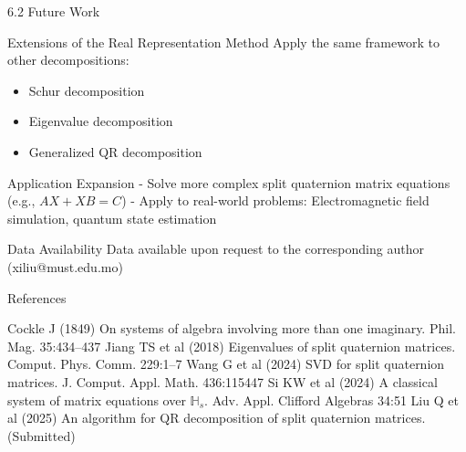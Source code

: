 \documentclass{beamer}
\begin{document}
\begin{frame}{6.2 Future Work}
  \begin{block}{Extensions of the Real Representation Method}
    Apply the same framework to other decompositions:
    \begin{itemize}
      \item Schur decomposition
      \item Eigenvalue decomposition
      \item Generalized QR decomposition
    \end{itemize}
  \end{block}
  
  \begin{block}{Application Expansion}
    - Solve more complex split quaternion matrix equations (e.g., $AX + XB = C$)
    - Apply to real-world problems: Electromagnetic field simulation, quantum state estimation
  \end{block}
  
  \begin{block}{Data Availability}
    Data available upon request to the corresponding author (xiliu@must.edu.mo)
  \end{block}
\end{frame}

\begin{frame}{References}
  \small
  \begin{thebibliography}{9}
     Cockle J (1849) On systems of algebra involving more than one imaginary. Phil. Mag. 35:434–437
     Jiang TS et al (2018) Eigenvalues of split quaternion matrices. Comput. Phys. Comm. 229:1–7
     Wang G et al (2024) SVD for split quaternion matrices. J. Comput. Appl. Math. 436:115447
     Si KW et al (2024) A classical system of matrix equations over $\mathbb{H}_s$. Adv. Appl. Clifford Algebras 34:51
     Liu Q et al (2025) An algorithm for QR decomposition of split quaternion matrices. (Submitted)
  \end{thebibliography}
\end{frame}



\logo{}
\end{document}
